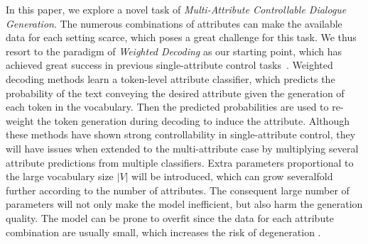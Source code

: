 In this paper, we explore a novel task of \textit{Multi-Attribute Controllable 
Dialogue Generation}. The numerous combinations of attributes can make the available data for each setting scarce, which poses a great challenge for this task. We thus resort to the paradigm of \textit{Weighted Decoding} as our starting point, which has achieved great success in previous single-attribute control tasks~\citep{arora2022director}. 
Weighted decoding methods learn a token-level attribute classifier, 
which predicts the probability of the text conveying the desired attribute 
given the generation of each token in the vocabulary. 
Then the predicted probabilities are used to 
re-weight the token generation during decoding to induce the attribute. 
Although these methods have shown strong controllability in single-attribute control, they will have issues when extended to the multi-attribute case 
by multiplying several attribute predictions from multiple classifiers. Extra 
parameters proportional to the large vocabulary size $|V|$ will be introduced, 
which can grow severalfold further according to the number of attributes. 
The consequent large number of parameters will not only make the model inefficient, but also harm the generation quality. The model can be prone to overfit since the data for each attribute combination are usually small, which increases the risk of degeneration \citep{holtzman2019curious}. 

